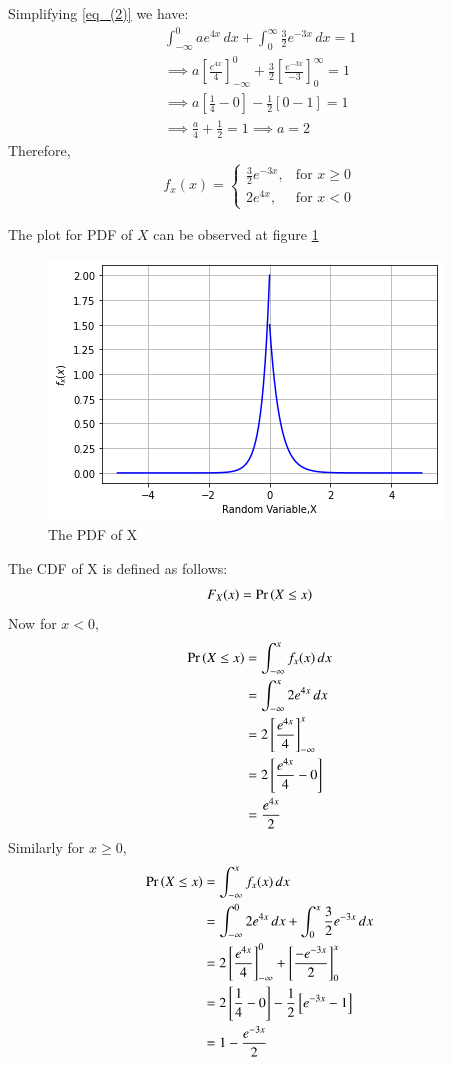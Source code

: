 \documentclass[journal,12pt,twocolumn]{IEEEtran}
\begin{document}
Simplifying \eqref{eq_(2)} we have:
\begin{align}
\int_{-\infty}^{0}{ae^{4x}}\,dx +\int_{0}^{\infty}{\frac{3}{2}e^{-3x}}\,dx = 1\nonumber\\
\implies a\left[\frac{e^{4x}}{4}\right]_{-\infty}^{0} +    \frac{3}{2}\left[\frac{e^{-3x}}{-3}\right]_0^{\infty} = 1\\
\implies a\left[\frac{1}{4}-0\right] - \frac{1}{2}\left[0-1\right] = 1\\
\implies \frac{a}{4} + \frac{1}{2} =1 \implies a = 2
\end{align}
Therefore,
\begin{align}
 f_x(x) = 
  \begin{cases}
  \frac{3}{2}e^{-3x}, & \text{for } x \geq 0\\
  2e^{4x}, & \text{for } x < 0
  \end{cases}
\end{align}

The plot for PDF of $X$ can be observed at figure \ref{fig:The PDF of X}
\begin{figure}[!ht]
       \centering
    \includegraphics[width=.9\columnwidth] {Assignment_2_Fig_2.png}
    \caption{The PDF of X}
    \label{fig:The PDF of X}
\end{figure}

The CDF of X is defined as follows:
\begin{align}
    F_X(x)= \Pr\left(X\leq x\right)
\end{align}
Now for $x<0$,
\begin{align}
\Pr\left(X\leq x\right) &= \int_{-\infty}^{x}{f_x(x)}\,dx\\
&= \int_{-\infty}^{x}{2e^{4x}}\,dx\\
&= 2\left[\frac{e^{4x}}{4}\right]_{-\infty}^{x}\\
&= 2\left[\frac{e^{4x}}{4}-0\right]\\
&= \frac{e^{4x}}{2}
\end{align}
Similarly for $x\geq0$,
\begin{align}
\Pr\left(X\leq x\right) &= \int_{-\infty}^{x}{f_x(x)}\,dx\\
&= \int_{-\infty}^{0}{2e^{4x}}\,dx +\int_{0}^{x}{\frac{3}{2}e^{-3x}}\,dx\\
&= 2\left[\frac{e^{4x}}{4}\right]_{-\infty}^{0}+\left[\frac{-e^{-3x}}{2}\right]_{0}^{x}\\
&= 2\left[\frac{1}{4}-0\right]-\frac{1}{2}\left[e^{-3x}-1\right]\\
&= 1-\frac{e^{-3x}}{2}
\end{align}
\end{document}
